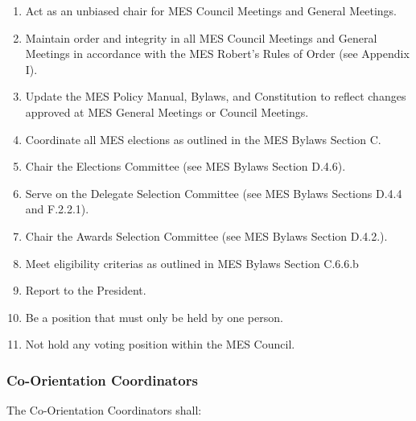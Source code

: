 \begin{enumerate}
 \item
  Act as an unbiased chair for MES Council Meetings and General
  Meetings.
 \item
  Maintain order and integrity in all MES Council Meetings and General
  Meetings in accordance with the MES Robert's Rules of Order (see
  Appendix I).
 \item
  Update the MES Policy Manual, Bylaws, and Constitution to reflect
  changes approved at MES General Meetings or Council Meetings.
 \item
  Coordinate all MES elections as outlined in the MES Bylaws Section C.
 \item
  Chair the Elections Committee (see MES Bylaws Section D.4.6).
 \item
  Serve on the Delegate Selection Committee (see MES Bylaws Sections
  D.4.4 and F.2.2.1).
 \item
  Chair the Awards Selection Committee (see MES Bylaws Section D.4.2.).
 \item
  Meet eligibility criterias as outlined in MES Bylaws Section C.6.6.b
 \item
  Report to the President.
 \item
  Be a position that must only be held by one person.
 \item
  Not hold any voting position within the MES Council.

\end{enumerate}

\hypertarget{co-orientation-coordinators}{%
 \subsubsection{Co-Orientation
  Coordinators}
 \label{co-orientation-coordinators}}
The Co-Orientation Coordinators shall:

